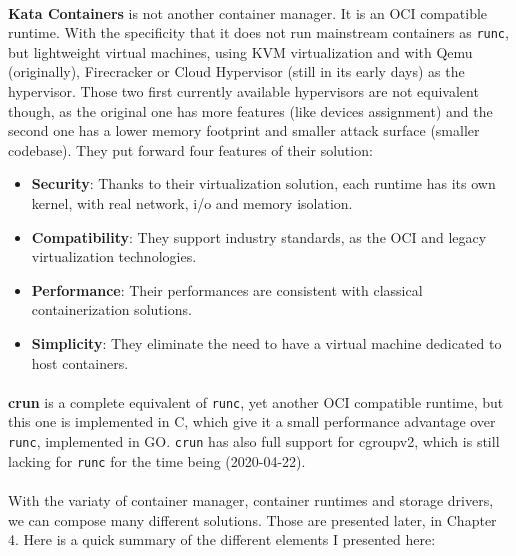 \paragraph{}\textbf{Kata Containers} is not another container manager.  It is an OCI compatible runtime.  With the specificity that it does not run mainstream containers as \texttt{runc}, but lightweight virtual machines, using KVM virtualization and with Qemu (originally), Firecracker or Cloud Hypervisor (still in its early days) as the hypervisor.  Those two first currently available hypervisors are not equivalent though, as the original one has more features (like devices assignment) and the second one has a lower memory footprint and smaller attack surface (smaller codebase).
They put forward four features of their solution:
\begin{itemize}
\renewcommand\labelitemi{--}
  \item \textbf{Security}: Thanks to their virtualization solution, each runtime has its own kernel, with real network, i/o and memory isolation.
  \item \textbf{Compatibility}:  They support industry standards, as the OCI\cite{oci} and legacy virtualization technologies.
  \item \textbf{Performance}:  Their performances are consistent with classical containerization solutions.
  \item \textbf{Simplicity}:  They eliminate the need to have a virtual machine dedicated to host containers.
\end{itemize}

\paragraph{}\textbf{crun} is a complete equivalent of \texttt{runc}, yet another OCI compatible runtime, but this one is implemented in C, which give it a small performance advantage over \texttt{runc}, implemented in GO.  \texttt{crun} has also full support for cgroupv2, which is still lacking for \texttt{runc} for the time being (2020-04-22).

\paragraph{}With the variaty of container manager, container runtimes and storage drivers, we can compose many different solutions.  Those are presented later, in Chapter 4.  Here is a quick summary of the different elements I presented here:

